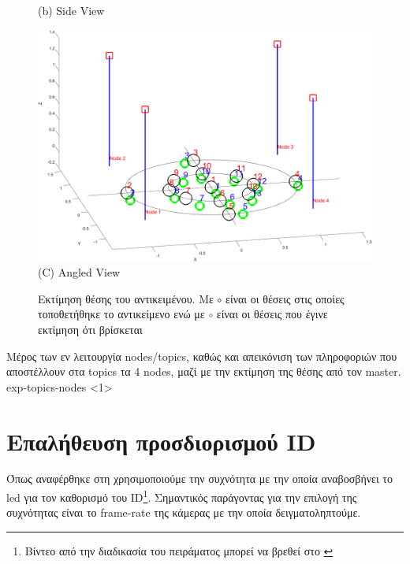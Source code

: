 \begin{figure} [H]
\begin{minipage}{.5\textwidth}
      {(b) Side View}
	  \end{minipage}
  \begin{minipage}{\textwidth}
    \centering
    \includegraphics[width=.8\linewidth]{../Images/Experiments-Results/nodes-pos-with-est-angle.png}\\
    {(C) Angled View}
  \end{minipage}
    \hfill \break
    \decoRule
    \caption[Εκτίμηση θέσης του αντικειμένου.]{Εκτίμηση θέσης του αντικειμένου. Με \textcolor{black}{\LARGE$\circ$} είναι οι θέσεις στις οποίες τοποθετήθηκε το αντικείμενο ενώ με \textcolor{green}{\LARGE$\circ$} είναι οι θέσεις που έγινε εκτίμηση ότι βρίσκεται} %
    \label{fig:multi-exp-pos-estimations}
\end{figure}

{Μέρος των εν λειτουργία nodes/topics, καθώς και απεικόνιση των πληροφοριών που αποστέλλουν στα topics τα 4 nodes, μαζί με την εκτίμηση της θέσης από τον master.}%
{exp-topics-nodes}%
<1>


\section{Επαλήθευση προσδιορισμού ID}
Όπως αναφέρθηκε στη  χρησιμοποιούμε την συχνότητα με την οποία αναβοσβήνει το led για τον καθορισμό του ID\footnote{Βίντεο από την διαδικασία του πειράματος μπορεί να βρεθεί στο \cite{experiment-blink-video}}. Σημαντικός παράγοντας για την επιλογή της συχνότητας είναι το frame-rate της κάμερας με την οποία δει\-γμα\-το\-λη\-πτού\-με. 

